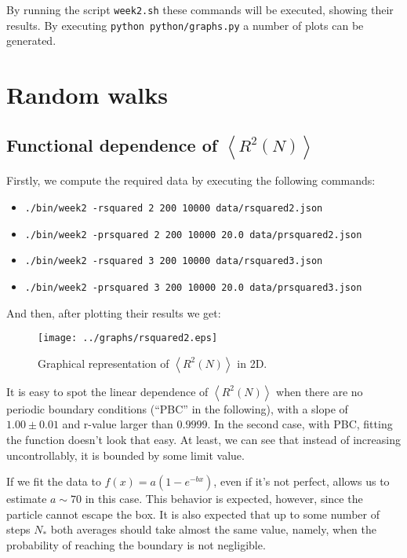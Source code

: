 \documentclass[10 pt]{article}
\newcommand{\avg}[1]{\left\langle #1 \right\rangle}
\begin{document}
By running the script \texttt{week2.sh} these commands will be executed, showing their results. By executing \texttt{python python/graphs.py} a number of plots can be generated.

\section{Random walks}

\subsection{Functional dependence of $\avg{R^2(N)}$}

Firstly, we compute the required data by executing the following commands:

\begin{itemize}
  \item \texttt{./bin/week2 -rsquared 2 200 10000 data/rsquared2.json}
  \item \texttt{./bin/week2 -prsquared 2 200 10000 20.0 data/prsquared2.json}
  \item \texttt{./bin/week2 -rsquared 3 200 10000 data/rsquared3.json}
  \item \texttt{./bin/week2 -prsquared 3 200 10000 20.0 data/prsquared3.json}
\end{itemize}

And then, after plotting their results we get:

\begin{figure}[H]
  \begin{center}
    \texttt{[image: ../graphs/rsquared2.eps]}
    \caption{Graphical representation of $\avg{R^2(N)}$ in 2D.}
  \end{center}
\end{figure}

It is easy to spot the linear dependence of $\avg{R^2(N)}$ when there are no periodic boundary conditions (``PBC'' in the following), with a slope of $1.00\pm0.01$ and r-value larger than $0.9999$. In the second case, with PBC, fitting the function doesn't look that easy. At least, we can see that instead of increasing uncontrollably, it is bounded by some limit value.

If we fit the data to $f(x) = a(1-e^{-bx})$, even if it's not perfect, allows us to estimate $a \sim 70$ in this case. This behavior is expected, however, since the particle cannot escape the box. It is also expected that up to some number of steps $N_*$ both averages should take almost the same value, namely, when the probability of reaching the boundary is not negligible.
\end{document}
